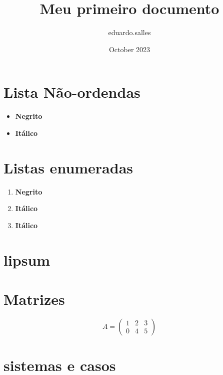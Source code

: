\documentclass{article}
\title{Meu primeiro documento}
\author{eduardo.salles}
\date{October 2023}
\begin{document}
\maketitle

\section{Lista Não-ordendas}

\begin{itemize}

    \item \textbf{Negrito}
    \item \textbf{Itálico}

\end{itemize}

\section{Listas enumeradas}

\begin{enumerate}

    \item \textbf{Negrito}
    \item \textbf{Itálico}
    \item \textbf{Itálico}

\end{enumerate}


\section{lipsum}

\lipsum[1-10]

\newpage

\section{Matrizes}

\begin{equation}
    A =
    \begin{pmatrix}
        1 & 2 & 3 \\
        0 & 4 & 5
    \end{pmatrix}
\end{equation}


\section{sistemas e casos}
\end{document}
